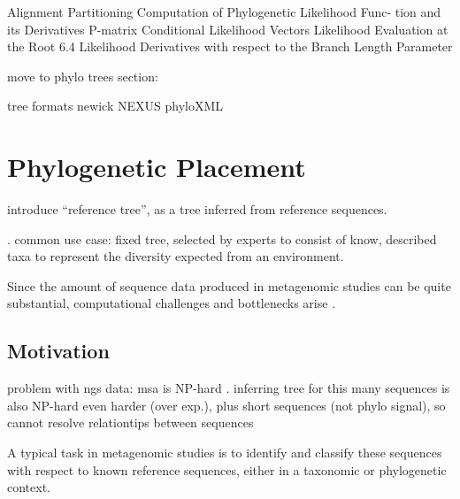 Alignment Partitioning
Computation of Phylogenetic Likelihood Func-
tion and its Derivatives
    P-matrix
    Conditional Likelihood Vectors
    Likelihood Evaluation at the Root
    6.4
Likelihood Derivatives with respect to the Branch Length
Parameter

move to phylo trees section:

tree formats
newick \cite{Archie1986}
NEXUS \cite{Maddison1997}
phyloXML \cite{Han2009}


\section{Phylogenetic Placement}
\label{ch:Foundations:sec:PhylogeneticPlacement}

introduce ``reference tree'', as a tree inferred from reference sequences.

. common use case: fixed tree, selected by experts to consist of know, described taxa
to represent the diversity expected from an environment.


Since the amount of sequence data produced in metagenomic studies can be quite substantial,
computational challenges and bottlenecks arise \cite{Scholz2012}.



\subsection{Motivation}
\label{ch:Foundations:sec:PhylogeneticPlacement:sub:Motivation}


problem with ngs data:
msa is NP-hard \cite{Just2001}.
inferring tree for this many sequences is also NP-hard \cite{Chor2005} even harder (over exp.), plus
short sequences (not phylo signal), so cannot resolve relationtips between sequences


A typical task in metagenomic studies is to identify and classify these sequences with respect
to known reference sequences, either in a taxonomic or phylogenetic context.

